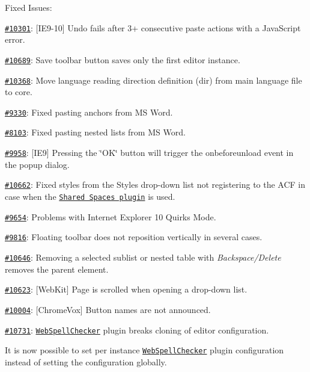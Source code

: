 Fixed Issues\-:
\begin{DoxyItemize}
\item \href{http://dev.ckeditor.com/ticket/10301}{\tt \#10301}\-: \mbox{[}I\-E9-\/10\mbox{]} Undo fails after 3+ consecutive paste actions with a Java\-Script error.
\item \href{http://dev.ckeditor.com/ticket/10689}{\tt \#10689}\-: Save toolbar button saves only the first editor instance.
\item \href{http://dev.ckeditor.com/ticket/10368}{\tt \#10368}\-: Move language reading direction definition ({\ttfamily dir}) from main language file to core.
\item \href{http://dev.ckeditor.com/ticket/9330}{\tt \#9330}\-: Fixed pasting anchors from M\-S Word.
\item \href{http://dev.ckeditor.com/ticket/8103}{\tt \#8103}\-: Fixed pasting nested lists from M\-S Word.
\item \href{http://dev.ckeditor.com/ticket/9958}{\tt \#9958}\-: \mbox{[}I\-E9\mbox{]} Pressing the \char`\"{}\-O\-K\char`\"{} button will trigger the {\ttfamily onbeforeunload} event in the popup dialog.
\item \href{http://dev.ckeditor.com/ticket/10662}{\tt \#10662}\-: Fixed styles from the Styles drop-\/down list not registering to the A\-C\-F in case when the \href{http://ckeditor.com/addon/sharedspace}{\tt Shared Spaces plugin} is used.
\item \href{http://dev.ckeditor.com/ticket/9654}{\tt \#9654}\-: Problems with Internet Explorer 10 Quirks Mode.
\item \href{http://dev.ckeditor.com/ticket/9816}{\tt \#9816}\-: Floating toolbar does not reposition vertically in several cases.
\item \href{http://dev.ckeditor.com/ticket/10646}{\tt \#10646}\-: Removing a selected sublist or nested table with {\itshape Backspace/\-Delete} removes the parent element.
\item \href{http://dev.ckeditor.com/ticket/10623}{\tt \#10623}\-: \mbox{[}Web\-Kit\mbox{]} Page is scrolled when opening a drop-\/down list.
\item \href{http://dev.ckeditor.com/ticket/10004}{\tt \#10004}\-: \mbox{[}Chrome\-Vox\mbox{]} Button names are not announced.
\item \href{http://dev.ckeditor.com/ticket/10731}{\tt \#10731}\-: \href{http://ckeditor.com/addon/wsc}{\tt Web\-Spell\-Checker} plugin breaks cloning of editor configuration.
\item It is now possible to set per instance \href{http://ckeditor.com/addon/wsc}{\tt Web\-Spell\-Checker} plugin configuration instead of setting the configuration globally.
\end{DoxyItemize}

